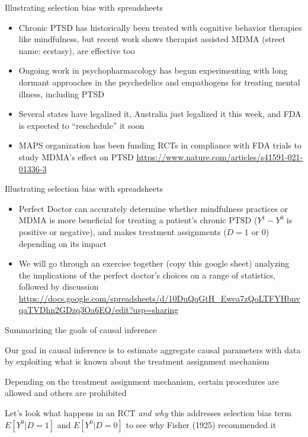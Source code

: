\documentclass{beamer}
\begin{document}
\begin{frame}{Illustrating selection bias with spreadsheets}

  \begin{itemize}
    \item Chronic PTSD has historically been treated with cognitive behavior therapies like mindfulness, but recent work shows therapist assisted MDMA (street name: ecstasy), are effective too
    \item Ongoing work in psychopharmacology has begun experimenting with long dormant approaches in the psychedelics and empathogens for treating mental illness, including PTSD
    \item Several states have legalized it, Australia just legalized it this week, and FDA is expected to ``reschedule'' it soon
    \item MAPS organization has been funding RCTs in compliance with FDA trials to study MDMA's effect on PTSD \url{https://www.nature.com/articles/s41591-021-01336-3}
    \end{itemize}
    
\end{frame}


\begin{frame}{Illustrating selection bias with spreadsheets}
\begin{itemize}
\item Perfect Doctor can accurately determine whether mindfulness practices or MDMA is more beneficial for treating a patient's chronic PTSD ($Y^1 - Y^0$ is positive or negative), and makes treatment assignments ($D=1$ or $0$) depending on its impact
\item We will go through an exercise together (copy this google sheet) analyzing the implications of the perfect doctor's choices on a range of statistics, followed by discussion \url{https://docs.google.com/spreadsheets/d/10DuQqGtH_Ewea7zQoLTFYHbnvqaTVDhn2GDzq3Oa6EQ/edit?usp=sharing}
\end{itemize}
\end{frame}


\begin{frame}{Summarizing the goals of causal inference}

  Our goal in causal inference is to estimate aggregate causal parameters with data by exploiting what is known about the treatment assignment mechanism

  \bigskip

Depending on the treatment assignment mechanism, certain procedures are allowed and others are prohibited

  \bigskip

  Let's look what happens in an RCT \emph{and why} this addresses selection bias term $E[Y^0|D=1]$ and $E[Y^0|D=0]$ to see why Fisher (1925) recommended it

\end{frame}
\end{document}
